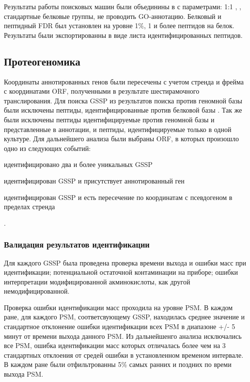 Результаты работы поисковых машин были объединины в  с параметрами: 1:1 , , стандартные белковые группы, не проводить GO-аннотацию. Белковый и пептидный FDR был установлен на уровне 1\%, 1 и более пептидов на белок. Результаты были экспортированны в виде листа идентифицированных пептидов.

\subsection{Протеогеномика }
Координаты аннотированных генов были пересечены с учетом стренда и фрейма с координатами ORF, полученными в результате шестирамочного транслирования.
Для поиска GSSP из результатов поиска против геномной базы  были исключены пептиды, идентифицированные против белковой базы . Так же были исключены пептиды идентифицируемые против геномной базы и представленные в аннотации, и пептиды, идентифицируемые только в одной культуре. Для дальнейшего анализа были выбраны ORF, в которых произошло одно из следующих событий:
\begin{inparaenum}
    \item идентифицировано два и более уникальных GSSP
    \item идентифицирован GSSP и присутствует аннотированный ген
    \item идентифицирован GSSP и есть пересечение по координатам с псевдогеном в пределах стренда
\end{inparaenum}.

\subsubsection{Валидация результатов идентификации}
Для каждого GSSP была проведена проверка времени выхода и ошибки масс при идентификации; потенциальной остаточной контаминации на приборе; ошибки интерпретации модифицированной акминокислоты, как другой немодифицированной.

Проверка ошибки идентификации масс проходила на уровне PSM. В каждом ране, для каждого PSM, соответсвующему GSSP, находилась среднее значение и стандартное отклонение ошибки идентификации всех PSM в диапазоне +/- 5 минут от времени выхода данного PSM. Из дальнейшенго анализа исключались все PSM, ошибка идентификации масс которых отличалась более чем на 3 стандартных отклоения от средей ошибки в установленном временом интервале. В каждом ране были отфильтрованны 5\% самых ранних и поздних по времи выхода PSM.


